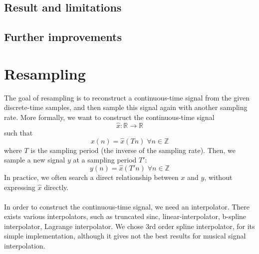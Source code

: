 \documentclass[letterpaper]{article}
\begin{document}
\subsection{Result and limitations}
\subsection{Further improvements}

\section{Resampling}
The goal of resampling is to reconstruct a continuous-time signal from the given
discrete-time samples, and then sample this signal again with another sampling
rate. More formally, we want to construct the continuous-time signal
\[\hat x:\mathbb{R}\to\mathbb{R}\]
such that
\[x(n) = \hat x(Tn) \;\forall n\in\mathbb{Z}\]
where \(T\) is the sampling period (the inverse of the sampling rate). Then, we
sample a new signal \(y\) at a sampling period \(T'\):
\[y(n) = \hat x(T'n) \;\forall n\in\mathbb{Z}\]
In practice, we often search a direct relationship between \(x\) and \(y\),
without expressing \(\hat x\) directly.
\paragraph{}
In order to construct the continuous-time signal, we need an interpolator. There
exists various interpolators, such as truncated sinc, linear-interpolator,
b-spline interpolator, Lagrange interpolator. We chose 3rd order spline
interpolator, for its simple implementation, although it gives not the best
results for musical signal interpolation.
\end{document}
